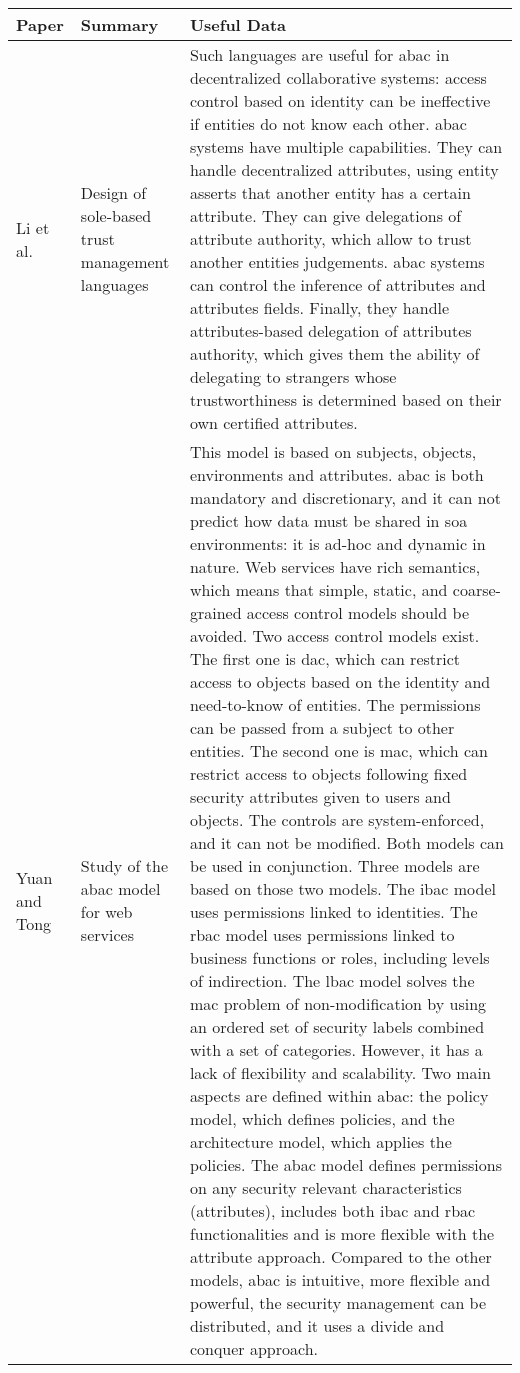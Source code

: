 \begin{small}
\begin{landscape}

	\begin{longtable}{p{1.5cm}|p{3cm}p{17.35cm}}
		\toprule[0.8mm]
		\textbf{Paper} & \textbf{Summary} & \textbf{Useful Data} \\
		\midrule[0.8mm]
		\endhead
		Li et al. \cite{li_design_2002} & Design of sole-based trust management languages & Such languages are useful for \gls{abac} in decentralized collaborative systems: access control based on identity can be ineffective if entities do not know each other. \gls{abac} systems have multiple capabilities. They can handle decentralized attributes, using entity asserts that another entity has a certain attribute. They can give delegations of attribute authority, which allow to trust another entities judgements. \gls{abac} systems can control the inference of attributes and attributes fields. Finally, they handle attributes-based delegation of attributes authority, which gives them the ability of delegating to strangers whose trustworthiness is determined based on their own certified attributes. \\ %
		\midrule
		Yuan and Tong \cite{yuan_attributed_2005} & Study of the \gls{abac} model for web services & This model is based on subjects, objects, environments and attributes. \gls{abac} is both mandatory and discretionary, and it can not predict how data must be shared in \gls{soa} environments: it is ad-hoc and dynamic in nature. Web services have rich semantics, which means that simple, static, and coarse-grained access control models should be avoided. Two access control models exist. The first one is \gls{dac}, which can restrict access to objects based on the identity and need-to-know of entities. The permissions can be passed from a subject to other entities. The second one is \gls{mac}, which can restrict access to objects following fixed security attributes given to users and objects. The controls are system-enforced, and it can not be modified. Both models can be used in conjunction. Three models are based on those two models. The \gls{ibac} model uses permissions linked to identities. The \gls{rbac} model uses permissions linked to business functions or roles, including levels of indirection. The \gls{lbac} model solves the \gls{mac} problem of non-modification by using an ordered set of security labels combined with a set of categories. However, it has a lack of flexibility and scalability. Two main aspects are defined within \gls{abac}: the policy model, which defines policies, and the architecture model, which applies the policies. The \gls{abac} model defines permissions on any security relevant characteristics (attributes), includes both \gls{ibac} and \gls{rbac} functionalities and is more flexible with the attribute approach. Compared to the other models, \gls{abac} is intuitive, more flexible and powerful, the security management can be distributed, and it uses a divide and conquer approach. \\ %

\end{longtable}
\end{landscape}
\end{small}
